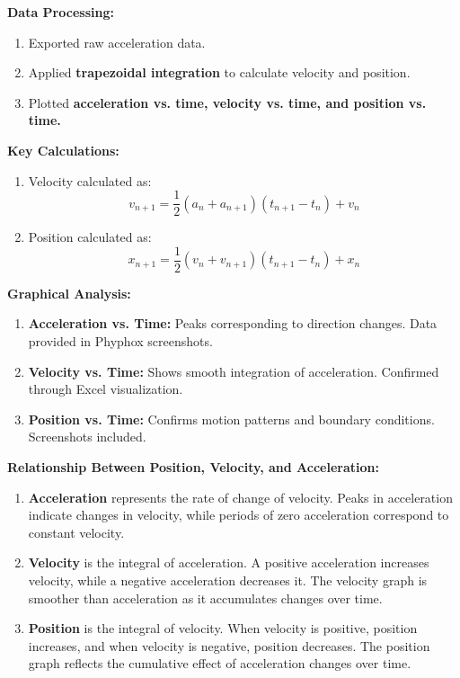 \documentclass[idxtotoc,hyperref,openany]{labbook} %
\begin{document}

\textbf{Data Processing:}
\begin{enumerate}[$\bullet$]
    \item Exported raw acceleration data.
    \item Applied \textbf{trapezoidal integration} to calculate velocity and position.
    \item Plotted \textbf{acceleration vs. time, velocity vs. time, and position vs. time.}
\end{enumerate}
\textbf{Key Calculations:}
\begin{enumerate}[$\bullet$]
     \item Velocity calculated as:
    \[
    v_{n+1} = \frac{1}{2} \left( a_n + a_{n+1} \right) \left( t_{n+1} - t_n \right) + v_n
    \]
    \item Position calculated as:
    \[
    x_{n+1} = \frac{1}{2} \left( v_n + v_{n+1} \right) \left( t_{n+1} - t_n \right) + x_n
    \]
\end{enumerate}
\textbf{Graphical Analysis:}
\begin{enumerate}[$\bullet$]
    \item \textbf{Acceleration vs. Time:} Peaks corresponding to direction changes. Data provided in Phyphox screenshots.
    \item \textbf{Velocity vs. Time:} Shows smooth integration of acceleration. Confirmed through Excel visualization.
    \item \textbf{Position vs. Time:} Confirms motion patterns and boundary conditions. Screenshots included.
\end{enumerate}
\textbf{Relationship Between Position, Velocity, and Acceleration:}
\begin{enumerate}[$\bullet$]
    \item \textbf{Acceleration} represents the rate of change of velocity. Peaks in acceleration indicate changes in velocity, while periods of zero acceleration correspond to constant velocity.
    \item \textbf{Velocity} is the integral of acceleration. A positive acceleration increases velocity, while a negative acceleration decreases it. The velocity graph is smoother than acceleration as it accumulates changes over time.
    \item \textbf{Position} is the integral of velocity. When velocity is positive, position increases, and when velocity is negative, position decreases. The position graph reflects the cumulative effect of acceleration changes over time.
\end{enumerate}
\end{document}
